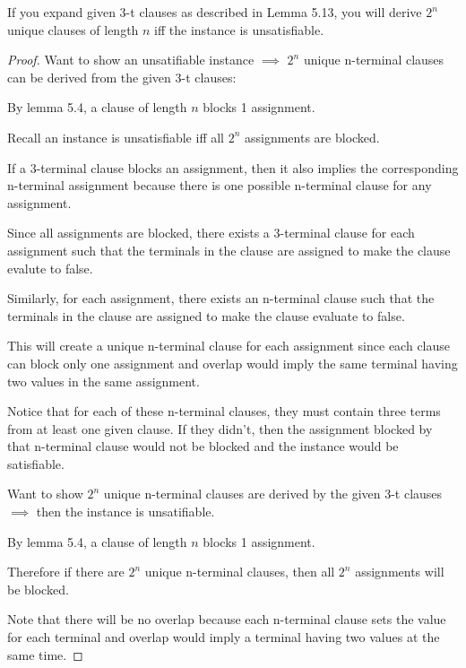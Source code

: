 \documentclass[manuscript]{acmart}
\begin{document}
    \begin{lemma}
        If you expand given 3-t clauses as described in Lemma 5.13, you will
        derive $2^n$ unique clauses of length $n$ iff the instance is unsatisfiable.
    \end{lemma}
    \begin{proof}
        Want to show an unsatifiable instance $\implies$ $2^n$ unique n-terminal
        clauses can be derived from the given 3-t clauses:

        By lemma 5.4, a clause of length $n$ blocks 1 assignment. 

        Recall an instance is unsatisfiable iff all $2^n$ assignments are
        blocked.

        If a 3-terminal clause blocks an assignment, then it also implies
        the corresponding n-terminal assignment because there is one possible
        n-terminal clause for any assignment.

        Since all assignments are blocked, there exists a 3-terminal clause for each
        assignment such that the terminals in the clause are assigned to make
        the clause evalute to false.

        Similarly, for each assignment, there exists an n-terminal clause such
        that the terminals in the clause are assigned to make the clause evaluate
        to false.

        This will create a unique n-terminal clause for each assignment since
        each clause can block only one assignment and overlap would imply
        the same terminal having two values in the same assignment.

        Notice that for each of these n-terminal clauses, they must contain
        three terms from at least one given clause. If they didn't, then
        the assignment blocked by that n-terminal clause would not be blocked
        and the instance would be satisfiable.

        Want to show $2^n$ unique n-terminal clauses are derived by the given
        3-t clauses $\implies$ then the instance is unsatifiable.

        By lemma 5.4, a clause of length $n$ blocks 1 assignment. 

        Therefore if there are $2^n$ unique n-terminal clauses, then
        all $2^n$ assignments will be blocked.

        Note that there will be no overlap because each n-terminal clause
        sets the value for each terminal and overlap would imply a terminal
        having two values at the same time.
    \end{proof}
\end{document}
